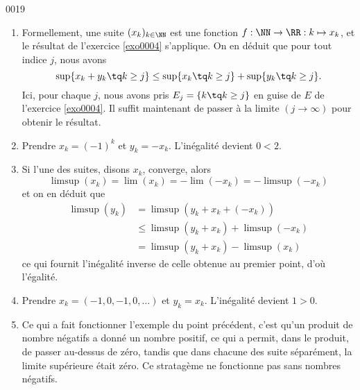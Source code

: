 
\begin{corrige}{0019}

\begin{enumerate}
\item Formellement, une suite $(x_k)_{k\in\NN}$ est une fonction $f : \NN \to \RR : k \mapsto x_k$, et le résultat de l'exercice \ref{exo0004} s'applique. On en déduit que pour tout indice $j$, nous avons
 \begin{equation*}
    \sup\{ x_k + y_k \tq k \geq j \} \leq   \sup\{ x_k \tq k \geq j \} +  \sup\{ y_k \tq k \geq j \}.
  \end{equation*}
Ici, pour chaque $j$, nous avons pris $E_j=\{ k\tq k\geq j \}$ en guise de $E$ de l'exercice \ref{exo0004}. Il suffit maintenant de passer à la limite $(j \to \infty)$ pour obtenir le résultat.
\item
Prendre $x_k = (-1)^k$ et $y_k = -x_k$. L'inégalité devient $0 <
  2$.

\item Si l'une des suites, disons $x_k$, converge, alors
  \begin{equation*}
    \limsup (x_k) = \lim (x_k) = - \lim(-x_k) = - \limsup (-x_k)
  \end{equation*}
  et on en déduit que
  \begin{equation*}
    \begin{split}
      \limsup (y_k) &= \limsup(y_k + x_k + (-x_k))\\
      &\leq \limsup(y_k + x_k) + \limsup (-x_k)\\
      &= \limsup(y_k + x_k) - \limsup (x_k)
    \end{split}
  \end{equation*}
  ce qui fournit l'inégalité inverse de celle obtenue au premier
  point, d'où l'égalité.

\item Prendre $x_k = (-1, 0, -1, 0, \ldots)$ et $y_k =
  x_k$. L'inégalité devient $1 > 0$.

\item 

Ce qui a fait fonctionner l'exemple du point précédent, c'est qu'un produit de nombre négatifs a donné un nombre positif, ce qui a permit, dans le produit,  de passer au-dessus de zéro, tandis que dans chacune des suite séparément, la limite supérieure était zéro. Ce stratagème ne fonctionne pas sans nombres négatifs.


\end{enumerate}
\end{corrige}
